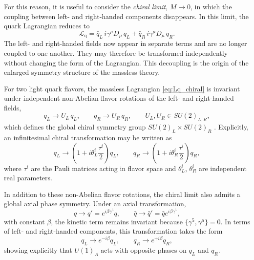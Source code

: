 For this reason, it is useful to consider the \emph{chiral limit},
$M \to 0$, in which the coupling between left- and right-handed
components disappears. In this limit, the quark Lagrangian reduces to
\begin{equation}
\mathcal{L}_{\mathrm{q}}
= \bar{q}_L\, i \gamma^\mu D_\mu\, q_L
+ \bar{q}_R\, i \gamma^\mu D_\mu\, q_R .
\label{eq:Lq_chiral}
\end{equation}
The left- and right-handed fields now appear in separate terms and are
no longer coupled to one another. They may therefore be transformed
independently without changing the form of the Lagrangian. This
decoupling is the origin of the enlarged symmetry structure of the
massless theory.

For two light quark flavors, the massless Lagrangian
\eqref{eq:Lq_chiral} is invariant under independent non-Abelian flavor
rotations of the left- and right-handed fields,
\begin{equation}
q_L \rightarrow U_L\, q_L,
\qquad
q_R \rightarrow U_R\, q_R,
\qquad
U_L, U_R \in SU(2)_{L,R},
\label{eq:chiral_rotations}
\end{equation}
which defines the global chiral symmetry group
$SU(2)_L \times SU(2)_R$ \cite{WeinbergQFT,ManoharGeorgi}. Explicitly,
an infinitesimal chiral transformation may be written as
\begin{equation}
q_L \rightarrow \left(1 + i \theta_L^i \frac{\tau^i}{2}\right) q_L,
\qquad
q_R \rightarrow \left(1 + i \theta_R^i \frac{\tau^i}{2}\right) q_R ,
\end{equation}
where $\tau^i$ are the Pauli matrices acting in flavor space and
$\theta_L^i$, $\theta_R^i$ are independent real parameters.

In addition to these non-Abelian flavor rotations, the chiral limit
also admits a global axial phase symmetry. Under an axial
transformation,
\begin{equation}
q \rightarrow q' = e^{i\beta \gamma^5} q ,
\qquad
\bar q \rightarrow \bar q' = \bar q e^{i\beta \gamma^5},
\label{eq:U1A}
\end{equation}
with constant $\beta$, the kinetic term remains invariant because
$\{\gamma^5,\gamma^\mu\}=0$. In terms of left- and right-handed
components, this transformation takes the form
\begin{equation}
q_L \rightarrow e^{-i\beta} q_L,
\qquad
q_R \rightarrow e^{+i\beta} q_R ,
\end{equation}
showing explicitly that $U(1)_A$ acts with opposite phases on $q_L$
and $q_R$.

